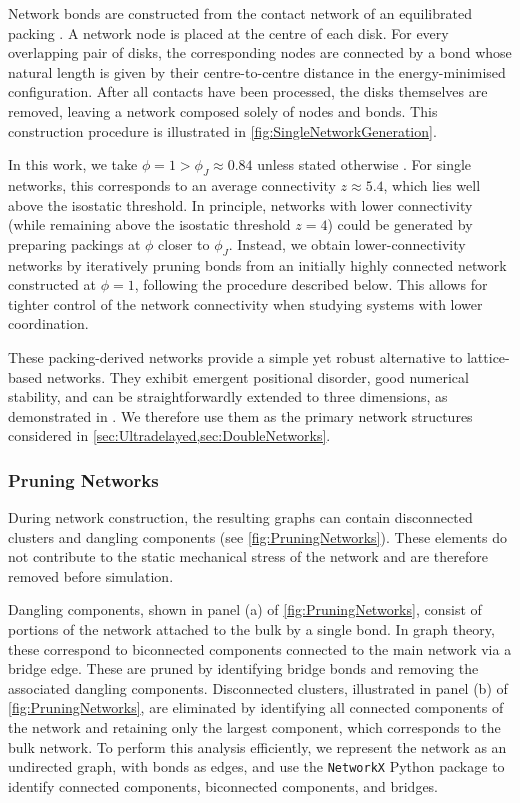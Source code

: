 Network bonds are constructed from the contact network of an equilibrated packing \cite{lerner_simulations_2013,ellenbroek_non-affine_2009,mangal_topological_2023}. A network node is placed at the centre of each disk. For every overlapping pair of disks, the corresponding nodes are connected by a bond whose natural length is given by their centre-to-centre distance in the energy-minimised configuration. After all contacts have been processed, the disks themselves are removed, leaving a network composed solely of nodes and bonds. This construction procedure is illustrated in \cref{fig:SingleNetworkGeneration}. 

In this work, we take $\phi = 1 > \phi_J \approx 0.84$ unless stated otherwise \cite{chacko_slow_2019,ikeda_unified_2012}. For single networks, this corresponds to an average connectivity $z \approx 5.4$, which lies well above the isostatic threshold. In principle, networks with lower connectivity (while remaining above the isostatic threshold $z=4$) could be generated by preparing packings at $\phi$ closer to $\phi_J$. Instead, we obtain lower-connectivity networks by iteratively pruning bonds from an initially highly connected network constructed at $\phi=1$, following the procedure described below. This allows for tighter control of the network connectivity when studying systems with lower coordination.

These packing-derived networks provide a simple yet robust alternative to lattice-based networks. They exhibit emergent positional disorder, good numerical stability, and can be straightforwardly extended to three dimensions, as demonstrated in \cite{shivers_normal_2019, shivers_strain-controlled_2023, shivers_nonlinear_2020}. We therefore use them as the primary network structures considered in \cref{sec:Ultradelayed,sec:DoubleNetworks}.

\subsubsection{Pruning Networks} \label{sec:PrunningNetwork}
During network construction, the resulting graphs can contain disconnected clusters and dangling components (see \cref{fig:PruningNetworks}). These elements do not contribute to the static mechanical stress of the network and are therefore removed before simulation.

Dangling components, shown in panel (a) of \cref{fig:PruningNetworks}, consist of portions of the network attached to the bulk by a single bond. In graph theory, these correspond to biconnected components connected to the main network via a bridge edge. These are pruned by identifying bridge bonds and removing the associated dangling components. Disconnected clusters, illustrated in panel (b) of \cref{fig:PruningNetworks}, are eliminated by identifying all connected components of the network and retaining only the largest component, which corresponds to the bulk network. To perform this analysis efficiently, we represent the network as an undirected graph, with bonds as edges, and use the \texttt{NetworkX} Python package \cite{SciPyProceedings_11} to identify connected components, biconnected components, and bridges.

